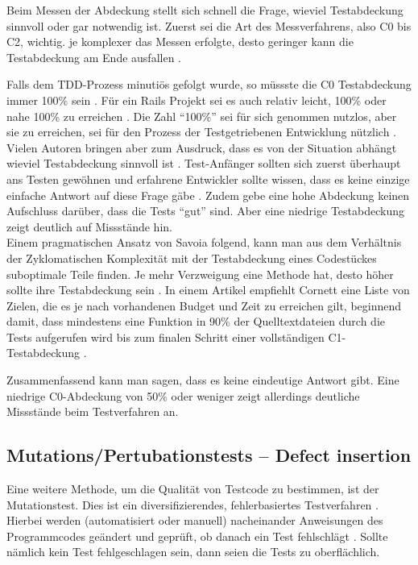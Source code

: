  Beim Messen der Abdeckung stellt sich schnell die Frage, wieviel Testabdeckung sinnvoll oder gar notwendig ist. Zuerst sei die Art des Messverfahrens, also C0 bis C2, wichtig. je komplexer das Messen erfolgte, desto geringer kann die Testabdeckung am Ende ausfallen \citep{catherine_powell_abakas_2008}.

 Falls dem TDD-Prozess minutiös gefolgt wurde, so müssste die C0 Testabdeckung immer 100\% sein \citep{beck_test_2002}. Für ein Rails Projekt sei es auch relativ leicht, 100\% oder nahe 100\% zu erreichen \citep{rappin_rails_2011}. Die Zahl "`100\%"' sei für sich genommen nutzlos, aber sie zu erreichen, sei für den Prozess der Testgetriebenen Entwicklung nützlich \citep[S. 270]{rappin_rails_2011}. Vielen Autoren bringen aber zum Ausdruck, dass es von der Situation abhängt wieviel Testabdeckung sinnvoll ist \citep{infoq_2007}. Test-Anfänger sollten sich zuerst überhaupt ans Testen gewöhnen und erfahrene Entwickler sollte wissen, dass es keine einzige einfache Antwort auf diese Frage gäbe \citep{infoq_2007}. Zudem gebe eine hohe Abdeckung keinen Aufschluss darüber, dass die Tests "`gut"' sind. Aber eine niedrige Testabdeckung zeigt deutlich auf Missstände hin.\\
 Einem pragmatischen Ansatz von Savoia folgend, kann man aus dem Verhältnis der Zyklomatischen Komplexität mit der Testabdeckung eines Codestückes suboptimale Teile finden. Je mehr Verzweigung eine Methode hat, desto höher sollte ihre Testabdeckung sein \citep{alberto_savoia_code_2007}. In einem Artikel empfiehlt Cornett eine Liste von Zielen, die es je nach vorhandenen Budget und Zeit zu erreichen gilt, beginnend damit, dass mindestens eine Funktion in 90\% der Quelltextdateien durch die Tests aufgerufen wird bis zum finalen Schritt einer vollständigen C1-Testabdeckung \citep{steve_cornett_code_1996}.

 Zusammenfassend kann man sagen, dass es keine eindeutige Antwort gibt. Eine niedrige C0-Abdeckung von 50\% oder weniger zeigt allerdings deutliche Missstände beim Testverfahren an.

 \subsection{Mutations/Pertubationstests -- Defect insertion}
 \label{sec:mutation}
 Eine weitere Methode, um die Qualität von Testcode zu bestimmen, ist der Mutationstest. Dies ist ein diversifizierendes, fehlerbasiertes Testverfahren \citep{liggesmeyer_modultest_1990}. Hierbei werden (automatisiert oder manuell) nacheinander Anweisungen des Programmcodes geändert und geprüft, ob danach ein Test fehlschlägt \citep{beck_test_2002}. Sollte nämlich kein Test fehlgeschlagen sein, dann seien die Tests zu oberflächlich.

